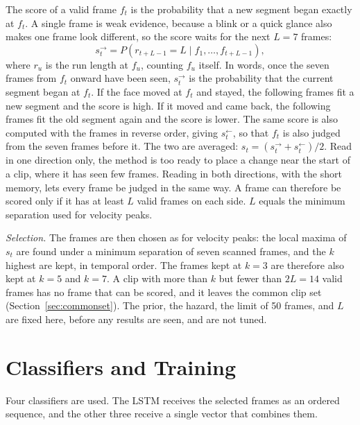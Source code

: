 The score of a valid frame $f_t$ is the probability that a new segment began exactly at $f_t$. A single frame is weak evidence, because a blink or a quick glance also makes one frame look different, so the score waits for the next $L = 7$ frames:
\begin{equation}
   s^{\rightarrow}_t = P\left(r_{t+L-1} = L \mid f_1, \dots, f_{t+L-1}\right),
   \label{eq:bocpdscore}
\end{equation}
where $r_u$ is the run length at $f_u$, counting $f_u$ itself. In words, once the seven frames from $f_t$ onward have been seen, $s^{\rightarrow}_t$ is the probability that the current segment began at $f_t$. If the face moved at $f_t$ and stayed, the following frames fit a new segment and the score is high. If it moved and came back, the following frames fit the old segment again and the score is lower. The same score is also computed with the frames in reverse order, giving $s^{\leftarrow}_t$, so that $f_t$ is also judged from the seven frames before it. The two are averaged: $s_t = (s^{\rightarrow}_t + s^{\leftarrow}_t)/2$. Read in one direction only, the method is too ready to place a change near the start of a clip, where it has seen few frames. Reading in both directions, with the short memory, lets every frame be judged in the same way. A frame can therefore be scored only if it has at least $L$ valid frames on each side. $L$ equals the minimum separation used for velocity peaks.

\emph{Selection.} The frames are then chosen as for velocity peaks: the local maxima of $s_t$ are found under a minimum separation of seven scanned frames, and the $k$ highest are kept, in temporal order. The frames kept at $k = 3$ are therefore also kept at $k = 5$ and $k = 7$. A clip with more than $k$ but fewer than $2L = 14$ valid frames has no frame that can be scored, and it leaves the common clip set (Section~\ref{sec:commonset}). The prior, the hazard, the limit of 50 frames, and $L$ are fixed here, before any results are seen, and are not tuned.



\section{Classifiers and Training}
\label{sec:training}

Four classifiers are used. The LSTM receives the selected frames as an ordered sequence, and the other three receive a single vector that combines them.

